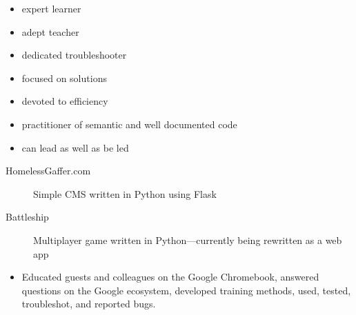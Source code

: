 \documentclass[letterpaper]{article}        %
\begin{document}
\begin{multicols}{3}
      \begin{itemize}
            \end{itemize}
    
      \begin{itemize}
        \item expert learner
        \item adept teacher
        \item dedicated troubleshooter
        \item focused on solutions
        \item devoted to efficiency
        \item practitioner of semantic and well documented code
        \item can lead as well as be led
        \end{itemize}
    
    
  \end{multicols}


  \begin{description}
    \item[HomelessGaffer.com] Simple CMS written in Python using Flask
    \item[Battleship] Multiplayer game written in Python---currently being rewritten as a web app
    
  \end{description}


  
    \begin{itemize}
    \item Educated guests and colleagues on the Google Chromebook, answered questions on the Google ecosystem, developed training methods, used, tested, troubleshot, and reported bugs.
    \end{itemize}
  
\end{document}
